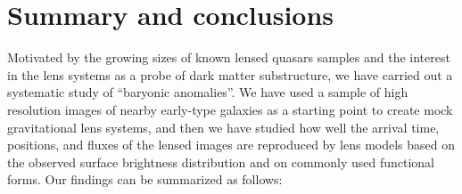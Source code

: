 \section{Summary and conclusions}\label{sect:conclusions}
Motivated by the growing sizes of known lensed quasars samples and the
interest in the lens systems as a probe of dark matter substructure,
we have carried out a systematic study of ``baryonic anomalies''. We
have used a sample of high resolution images of nearby early-type
galaxies as a starting point to create mock gravitational lens
systems, and then we have studied how well the arrival time,
positions, and fluxes of the lensed images are reproduced by lens
models based on the observed surface brightness distribution and on
commonly used functional forms. Our findings can be summarized as
follows:

